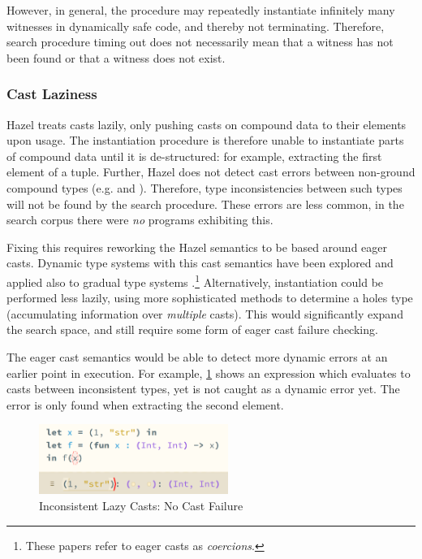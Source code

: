 However, in general, the procedure may repeatedly instantiate infinitely many witnesses in dynamically safe code, and thereby not terminating. Therefore, search procedure timing out does not necessarily mean that a witness has not been found or that a witness does not exist.

\subsubsection{Cast Laziness}\label{sec:EvalCastLaziness}
Hazel treats casts lazily, only pushing casts on compound data to their elements upon usage. The instantiation procedure is therefore unable to instantiate parts of compound data until it is de-structured: for example, extracting the first element of a tuple. Further, Hazel does not detect cast errors between non-ground compound types (e.g. \code{[Int]} and \code{[String]}). Therefore, type inconsistencies between such types will not be found by the search procedure. These errors are less common, in the search corpus there were \textit{no} programs exhibiting this.

Fixing this requires reworking the Hazel semantics to be based around eager casts. Dynamic type systems with this cast semantics have been explored \cite{EagerCasts} and applied also to gradual type systems \cite{GradualEagerCasts}.\footnote{These papers refer to eager casts as \textit{coercions}.} Alternatively, instantiation could be performed less lazily, using more sophisticated methods to determine a holes type (accumulating information over \textit{multiple} casts). This would significantly expand the search space, and still require some form of eager cast failure checking.

The eager cast semantics would be able to detect more dynamic errors at an earlier point in execution. For example, \cref{fig:LazyCastError} shows an expression which evaluates to casts between inconsistent types, yet is not caught as a dynamic error yet. The error is only found when extracting the second element.
\begin{figure}[h]
\centering
\includegraphics[width=0.55\textwidth]{Media/Figures/cast_laziness_no_error}
\caption{Inconsistent Lazy Casts: No Cast Failure}
\label{fig:LazyCastError}
\end{figure}


